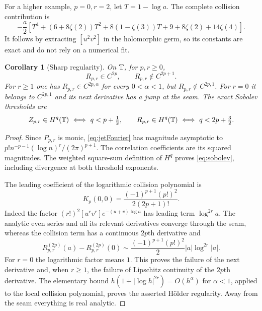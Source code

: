 \documentclass[11pt]{article}
\numberwithin{equation}{section}
\newtheorem{corollary}[theorem]{Corollary}
\theoremstyle{definition}\newtheorem{definition}[theorem]{Definition}
\theoremstyle{remark}\newtheorem{remark}[theorem]{Remark}
\begin{document}
For a higher example, $p=0,r=2$, let $T=1-\log a$. The complete
collision contribution is
\begin{equation}\label{eq:secondjetcusp}
 -\frac a2\left[T^4+(6+8\zeta(2))T^2+8(1-\zeta(3))T
                          +9+8\zeta(2)+14\zeta(4)\right].
\end{equation}
It follows by extracting $[u^2v^2]$ in the holomorphic germ, so its
constants are exact and do not rely on a numerical fit.

\begin{corollary}[Sharp regularity]\label{cor:jetregularity}
On $\mathbb T$, for $p,r\ge0$,
\begin{equation}\label{eq:jetregularity}
 R_{p,r}\in C^{2p},\qquad R_{p,r}\notin C^{2p+1}.
\end{equation}
For $r\ge1$ one has $R_{p,r}\in C^{2p,\alpha}$ for every $0<\alpha<1$,
but $R_{p,r}\notin C^{2p,1}$. For $r=0$ it belongs to $C^{2p,1}$ and
its next derivative has a jump at the seam. The exact Sobolev thresholds
are
\begin{equation}\label{eq:sobolev}
 Z_{p,r}\in H^q(\T)\ \Longleftrightarrow\ q<p+\tfrac12,
 \qquad
 R_{p,r}\in H^q(\T)\ \Longleftrightarrow\ q<2p+\tfrac32.
\end{equation}
\end{corollary}
\begin{proof}
Since $P_{p,r}$ is monic, \eqref{eq:jetFourier} has magnitude
asymptotic to
$p!n^{-p-1}(\log n)^r/(2\pi)^{p+1}$.
The correlation coefficients are its squared magnitudes. The weighted
square-sum definition of $H^q$ proves \eqref{eq:sobolev}, including
divergence at both threshold exponents.

The leading coefficient of the logarithmic collision polynomial is
\begin{equation}\label{eq:universalcollision}
 K_p(0,0)=\frac{(-1)^{p+1}(p!)^2}{2(2p+1)!}.
\end{equation}
Indeed the factor $(r!)^2[u^rv^r]e^{-(u+v)\log a}$ has leading term
$\log^{2r}a$. The analytic even series and all its relevant derivatives
converge through the seam, whereas the collision term has a continuous
$2p$th derivative and
\begin{equation}\label{eq:jetseam}
 R_{p,r}^{(2p)}(a)-R_{p,r}^{(2p)}(0)
 \sim\frac{(-1)^{p+1}(p!)^2}{2}|a|\log^{2r}|a|.
\end{equation}
For $r=0$ the logarithmic factor means $1$. This proves the failure of
the next derivative and, when $r\ge1$, the failure of Lipschitz
continuity of the $2p$th derivative. The elementary bound
$h(1+|\log h|^{2r})=O(h^\alpha)$ for $\alpha<1$, applied to the local
collision polynomial, proves the asserted H\"older regularity. Away
from the seam everything is real analytic.
\end{proof}
\end{document}
